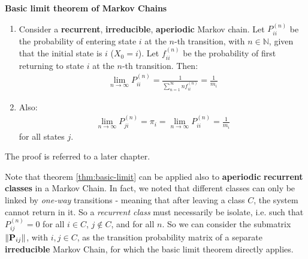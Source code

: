 \documentclass[../template.tex]{subfiles}
\begin{document}
\begin{thm} \textbf{Basic limit theorem of Markov Chains}\label{thm:basic-limit}

    \begin{enumerate}[label=(\alph*)]
        \item Consider a \textbf{recurrent}, \textbf{irreducible}, \textbf{aperiodic} Markov chain. Let $P_{ii}^{(n)}$ be the probability of entering state $i$  at the $n$-th transition, with $n \in \mathbb{N}$, given that the initial state is $i$ ($X_0 = i$). Let $f_{ii}^{(n)}$ be the probability of first returning to state $i$ at the $n$-th transition. Then:
        \begin{align*}
            \lim_{n \to \infty} P_{ii}^{(n)} = \frac{1}{\sum_{n=1}^\infty n f_{ii}^{(n)}} = \frac{1}{m_i}  
        \end{align*}  
        \item Also:
        \begin{align*}
            \lim_{n \to \infty} P_{ji}^{(n)} = \pi_i =\lim_{n \to \infty} P_{ii}^{(n)} = \frac{1}{m_i} 
        \end{align*}
        for all states $j$.
    \end{enumerate}
\end{thm}

The proof is referred to a later chapter.

\medskip

Note that theorem \ref{thm:basic-limit} can be applied also to \textbf{aperiodic} \textbf{recurrent classes} in a Markov Chain. In fact, we noted that different classes can only be linked by \textit{one-way} transitions - meaning that after leaving a class $C$, the system cannot return in it. So a \textit{recurrent class} must necessarily be isolate, i.e. such that $P_{ij}^{(n)} = 0$ for all $i \in C$, $j \notin C$, and for all $n$. So we can consider the submatrix $\norm{\textbf{P}_{ij}}$, with $i,j \in C$, as the transition probability matrix of a separate \textbf{irreducible} Markov Chain, for which the basic limit theorem directly applies. 

\medskip
\end{document}
